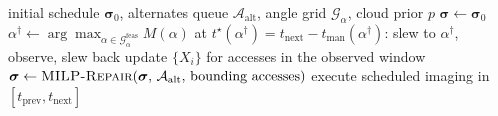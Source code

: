 \begin{algorithm}[htbp]
\caption{Dynamic tasking control loop}
\label{alg:dt_loop}
\begin{algorithmic}[1]
\Require initial schedule $\boldsymbol{\sigma}_0$, alternates queue $\mathcal{A}_{\text{alt}}$, angle grid $\mathcal{G}_\alpha$, cloud prior $p$
\State $\boldsymbol{\sigma} \gets \boldsymbol{\sigma}_0$
    \State $\alpha^\dagger \gets \arg\max_{\alpha \in \mathcal{G}_\alpha^{\mathrm{feas}}} M(\alpha)$ 
        \State at $t^\star(\alpha^\dagger) = t_{\mathrm{next}} - t_{\mathrm{man}}(\alpha^\dagger)$: slew to $\alpha^\dagger$, observe, slew back 
        \State update $\{X_i\}$ for accesses in the observed window
        \State $\boldsymbol{\sigma} \gets \textsc{MILP-Repair}(\boldsymbol{\sigma},\, \mathcal{A}_{\text{alt}},\, \text{bounding accesses})$
    \EndIf
    \State execute scheduled imaging in $[t_{\mathrm{prev}}, t_{\mathrm{next}}]$
\EndFor
\end{algorithmic}
\end{algorithm}
